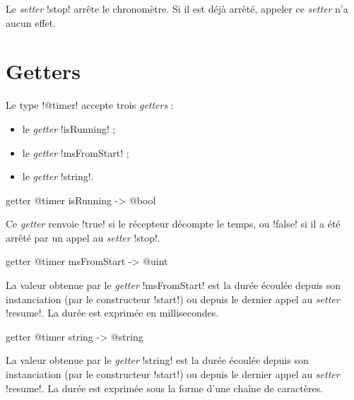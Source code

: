Le \emph{setter} \ggs!stop! arrête le chronomètre. Si il est déjà arrêté, appeler ce \emph{setter} n'a aucun effet.







\section{Getters}

Le type \ggs!@timer! accepte trois \emph{getters} :
\begin{itemize}
  \item le \emph{getter} \ggs!isRunning! ;
  \item le \emph{getter} \ggs!msFromStart! ;
  \item le \emph{getter} \ggs!string!.
\end{itemize}


\begin{galgasbox}
getter @timer isRunning -> @bool
\end{galgasbox}

Ce \emph{getter} renvoie  \ggs!true! si le récepteur décompte le temps, ou \ggs!false! si il a été arrêté par un appel au \emph{setter} \ggs!stop!.



\begin{galgasbox}
getter @timer msFromStart -> @uint
\end{galgasbox}

La valeur obtenue par le \emph{getter} \ggs!msFromStart! est la durée écoulée depuis son instanciation (par le constructeur \ggs!start!) ou depuis le dernier appel au \emph{setter} \ggs!resume!. La durée est exprimée en millisecondes.



\begin{galgasbox}
getter @timer string -> @string
\end{galgasbox}

La valeur obtenue par le \emph{getter} \ggs!string! est la durée écoulée depuis son instanciation (par le constructeur \ggs!start!) ou depuis le dernier appel au \emph{setter} \ggs!resume!. La durée est exprimée sous la forme d'une chaîne de caractères.

